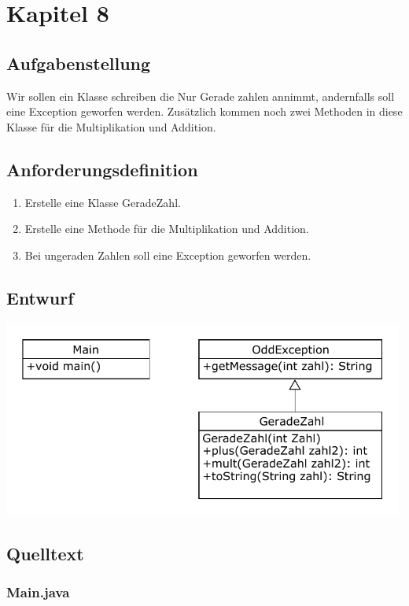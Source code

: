 \section{Kapitel 8}
\subsection{Aufgabenstellung}
Wir sollen ein Klasse schreiben die Nur Gerade zahlen annimmt, andernfalls soll eine Exception
geworfen werden. Zusätzlich kommen noch zwei Methoden in diese Klasse für 
die Multiplikation und Addition.

\subsection{Anforderungsdefinition}
\begin{enumerate}
	\item Erstelle eine Klasse GeradeZahl.
	\item Erstelle eine Methode für die Multiplikation und Addition.
	\item Bei ungeraden Zahlen soll eine Exception geworfen werden.
\end{enumerate}

\subsection{Entwurf}
\begin{center}
	\includegraphics[width=0.99\textwidth]{uml/uml_c8_p1.pdf}
\end{center}

\subsection{Quelltext}
\subsubsection{Main.java}

